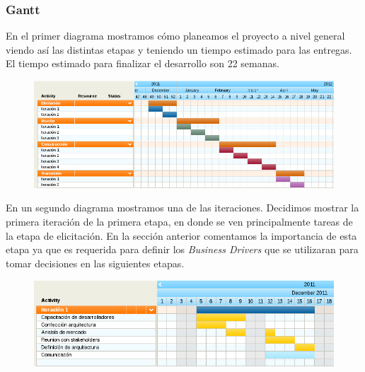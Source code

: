 \subsubsection{Gantt}

En el primer diagrama mostramos cómo planeamos el proyecto a nivel general viendo así las distintas etapas y teniendo un tiempo estimado para las entregas. El tiempo estimado para
finalizar el desarrollo son 22 semanas.	

\begin{figure}[H]
 \includegraphics[scale=0.7]{./ganttetapas.png}
\end{figure}

En un segundo diagrama mostramos una de las iteraciones. Decidimos mostrar la primera iteración de la primera etapa, en donde se ven principalmente tareas de la etapa de elicitación. En la sección anterior comentamos la importancia de esta etapa ya que es requerida para definir los \emph{Business Drivers} que se utilizaran para tomar decisiones en las siguientes etapas.

\begin{figure}[H]
\begin{center}
 \includegraphics[scale=0.7]{./ganttiteracion.png}
\end{center}
\end{figure}

\renewcommand{\labelitemi}{$\tiny \blacksquare$}


